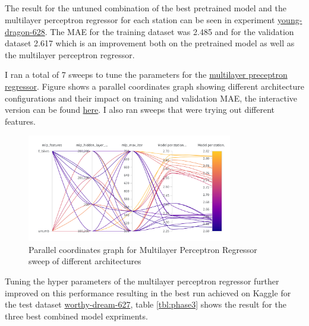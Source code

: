 \documentclass[a4paper]{article}
\begin{document}
    \subsection*{}

    The result for the untuned combination of the best pretrained model and the multilayer perceptron regressor for each station can be seen
    in experiment \href{https://wandb.ai/idegen/mlp-2021/runs/ogsyvkqu?workspace=user-idegen}{young-dragon-628}. The
    MAE for the training dataset was 2.485 and for the validation dataset 2.617 which is an improvement both on the pretrained model
    as well as the multilayer perceptron regressor.

    I ran a total of 7 sweeps to tune the parameters for the \href{https://wandb.ai/idegen/mlp-2021/sweeps?workspace=user-idegen}{multilayer preceptron regressor}.
    Figure shows a parallel coordinates graph showing different architecture configurations and their impact on training and
    validation MAE, the interactive version can be found \href{https://wandb.ai/idegen/mlp-2021/sweeps/rughds30?workspace=user-idegen}{here}.
    I also ran sweeps that were trying out different features.

    \begin{figure}[h]
        \centering
        \includegraphics[width=0.8\textwidth]{mlp-sweep}
        \caption{Parallel coordinates graph for Multilayer Perceptron Regressor sweep of different architectures}
        \label{fig:mlp-sweep}
    \end{figure}

    Tuning the hyper parameters of the multilayer perceptron regressor further improved on this performance resulting
    in the best run achieved on Kaggle for the test dataset
    \href{https://wandb.ai/idegen/mlp-2021/runs/2w4l1irf?workspace=user-idegen}{worthy-dream-627}, table
    \ref{tbl:phase3}
    shows the result for the three best combined model expriments.
\end{document}
